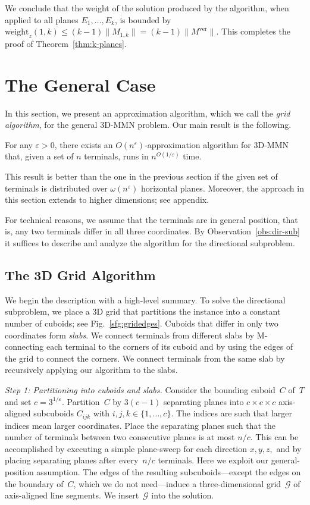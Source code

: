 \documentclass[11pt]{llncs}
\newcommand{\Mver}{\ensuremath{M^\mathrm{ver}}\xspace}
\newcommand{\cost}{\ensuremath{\mathrm{weight}}\xspace}
\newcommand{\eps}{\ensuremath{\varepsilon}\xspace}
\begin{document}
We conclude that the
weight of the solution produced by the algorithm, when applied to all
planes $E_1,\dots,E_k$, is bounded by $\cost_z(1,k)\leq
(k-1)\|M_{1,k}\|=(k-1)\|\Mver\|$.
This completes the proof of Theorem~\ref{thm:k-planes}. 



\section{The General Case}
\label{sec:general-case}

In this section, we present an
approximation algorithm, which we call the \emph{grid 
  algorithm}, for the general 3D-MMN problem.  Our main result is the following.
\begin{theorem}
  \label{thm:3dmain}
  For any $\eps>0$, there exists an $O(n^\eps)$-approximation
  algorithm for 3D-MMN that, given a set of $n$ terminals, runs in
  $n^{O(1/\eps)}$ time.
\end{theorem}
This result is better than the one in the previous section if the
given set of terminals is distributed over $\omega(n^\eps)$ horizontal
planes.  Moreover, the approach in this section extends to higher
dimensions; see appendix.

For technical reasons, we assume that the terminals are in general
position, that is, any two terminals differ in all three coordinates.
By Observation~\ref{obs:dir-sub} it suffices to describe and analyze
the algorithm for the directional subproblem. 

\subsection{The 3D Grid Algorithm} 
\label{sec:gridalg}

We begin the description with a high-level summary.  To solve the
directional subproblem, we place a 3D grid that partitions the
instance into a constant number of cuboids; see
Fig.~\ref{sfg:gridedges}. Cuboids that differ in only two 
coordinates form \emph{slabs}. We connect terminals from different
slabs by M-connecting each terminal to the corners of its cuboid and
by using the edges of the grid to connect the corners.  We connect
terminals from the same slab by recursively applying our algorithm to
the slabs.

\medskip
\noindent
{\em Step 1: Partitioning into cuboids and slabs.} Consider the bounding
cuboid~$C$ of~$T$ and set $c=3^{1/\eps}$.  Partition~$C$ 
by $3(c-1)$ separating planes into $c\times c\times c$ axis-aligned
subcuboids $C_{ijk}$ with $i,j,k \in \{1,\ldots,c\}$.  The indices are
such that larger indices mean larger coordinates.  Place the separating
planes such that the number of terminals between two consecutive planes is at
most $n/c$.  This can be accomplished by executing a simple plane-sweep 
for each direction $x, y, z,$ and by placing separating planes after
every~$n/c$ terminals.  Here we exploit our general-position assumption.
The edges of the resulting subcuboids---except the edges on the boundary
of~$C$, which we do not need---induce a three-dimensional 
grid~$\mathcal{G}$ of axis-aligned line segments.  We insert~$\mathcal{G}$
into the solution.
\end{document}
